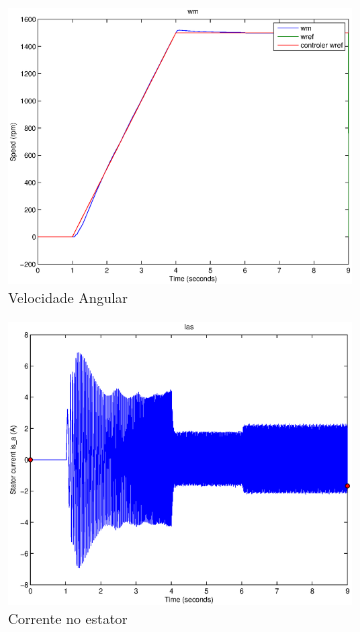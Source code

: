 \documentclass{article}
\begin{document}
\begin{figure}[H]
	\centering
	\begin{subfigure}[b]{0.49\linewidth}
		\includegraphics[width=\linewidth]{matlab/wm2}
		\caption{Velocidade Angular}
	\end{subfigure}
	\begin{subfigure}[b]{0.49\linewidth}
		\centering
		\includegraphics[width=\linewidth]{matlab/ias2}
		\caption{Corrente no estator}
	\end{subfigure}
	\begin{subfigure}[b]{0.49\linewidth}
		\centering

\end{subfigure}
\end{figure}
\end{document}
